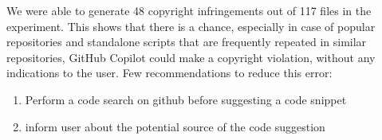 We were able to generate 48 copyright infringements out of 117 files in the experiment. This shows that there is a chance, especially in case of popular repositories and standalone scripts that are frequently repeated in similar repositories, GitHub Copilot could make a copyright violation, without any indications to the user. 
Few recommendations to reduce this error:
\begin{enumerate}
    \item Perform a code search on github before suggesting a code snippet
    \item inform user about the potential source of the code suggestion
\end{enumerate}
